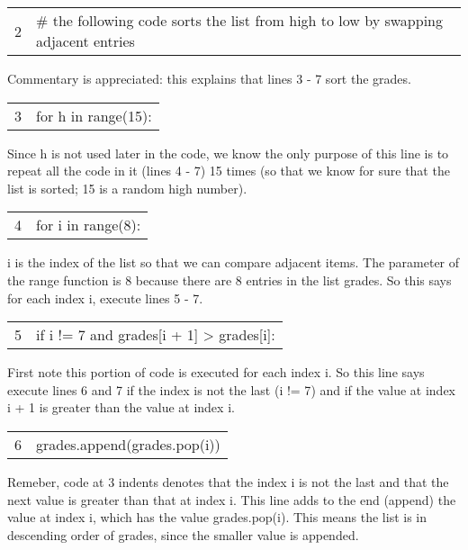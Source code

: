 \documentclass{article}
\newcommand{\icode}[1]{{\ttfamily #1}}
\newenvironment{code}{\begin{tcolorbox}\ttfamily}{\end{tcolorbox}}
\begin{document}
\begin{code}
	\begin{tabular}{l|l}
		2&\# the following code sorts the list from high to low by swapping adjacent entries
	\end{tabular}
\end{code}
Commentary is appreciated: this explains that lines 3 - 7 sort the grades.

\begin{code}
	\begin{tabular}{l|l}
		3&for h in range(15):
	\end{tabular}
\end{code}
Since \icode{h} is not used later in the code, we know the only purpose of this line is to repeat all the code in it (lines 4 - 7) 15 times (so that we know for sure that the list is sorted; 15 is a random high number).

\begin{code}
	\begin{tabular}{l|l}
		4&\hspace{2 em}for i in range(8):
	\end{tabular}
\end{code}
\icode{i} is the index of the list so that we can compare adjacent items. The parameter of the range function is 8 because there are 8 entries in the list \icode{grades}. So this says for each index \icode{i}, execute lines 5 - 7.

\begin{code}
	\begin{tabular}{l|l}
		5&\hspace{4 em}if i != 7 and grades[i + 1] > grades[i]:
	\end{tabular}
\end{code}
First note this portion of code is executed for each index \icode{i}. So this line says execute lines 6 and 7 if the index is not the last (\icode{i != 7}) and if the value at index \icode{i + 1} is greater than the value at index \icode{i}.

\begin{code}
	\begin{tabular}{l|l}
		6& \hspace{6 em}grades.append(grades.pop(i))\\
	\end{tabular}
\end{code}
Remeber, code at 3 indents denotes that the index \icode{i} is not the last and that the next value is greater than that at index \icode{i}. This line adds to the end (append) the value at index \icode{i}, which has the value \icode{grades.pop(i)}. This means the list is in descending order of grades, since the smaller value is appended.
\end{document}
